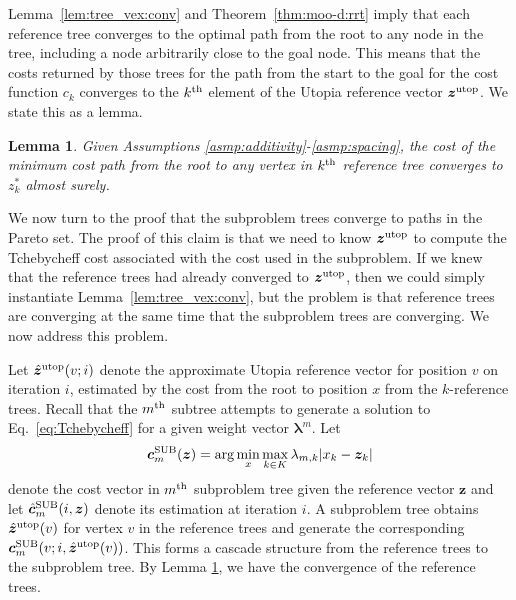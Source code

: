 \documentclass{article}
\newtheorem{lem}{Lemma}
\begin{document}
Lemma~\ref{lem:tree_vex:conv} and Theorem~\ref{thm:moo-d:rrt} imply that each reference tree converges to the optimal path from the root to any node in the tree, including a node arbitrarily close to the goal node.  
This means that the costs returned by those trees for the path from the start to the goal for the cost function $c_k$ converges to the $k^{\rm th}$ element of the Utopia reference vector $ \bm{z}^{\rm utop} $.  
We state this as a lemma.
\begin{lem}
\label{lem:ref_tree:conv}
Given Assumptions \ref{asmp:additivity}-\ref{asmp:spacing},
the cost of the minimum cost path from the root to any vertex in $ k^{\rm th} $ reference tree converges to $ z^{*}_{k} $ almost surely. %
\end{lem}

We now turn to the proof that the subproblem trees converge to paths in the Pareto set.
The proof of this claim is that we need to know $\bm{z}^{\rm utop} $ to compute the Tchebycheff cost associated with the cost used in the subproblem. 
If we knew that the reference trees had already converged to $\bm{z}^{\rm utop} $, then we could simply instantiate Lemma~\ref{lem:tree_vex:conv}, but the problem is that reference trees are converging at the same time that the subproblem trees are converging.
We now address this problem.  

Let $ \hat{\bm{z}}^{\rm utop}(v;i) $ denote the approximate Utopia reference vector for position $v$ on iteration $i$, estimated by the cost from the root to position $x$ from the $k$-reference trees.
Recall that the $m^{\rm th}$ subtree attempts to generate a solution to Eq.~\eqref{eq:Tchebycheff} for a given weight vector ${\mathbf \lambda}^m$.
Let
\begin{equation}
\label{eq:c_def}
 \bm{c}^{\rm SUB}_{m} ( \bm{z} ) 
 = \arg \min_{x} \max_{ k \in K } \lambda_{m, k} | x_{k} - \bm{z}_{k} | 
\end{equation} denote the cost vector in $ m^{\rm th} $ subproblem tree given the reference vector $ \bm{z} $ and let
$ \hat{ \bm{c} }^{\rm SUB}_{m} ( i, \bm{z} ) $ denote its estimation at iteration $ i $.
A subproblem tree obtains $ \hat{\bm{z}}^{\rm utop} (v) $ for vertex $ v $ in the reference trees and generate the corresponding $ \bm{c}^{\rm SUB}_{m} ( v ; i, \hat{\bm{z}}^{\rm utop} (v) ) $.
This forms a cascade structure from the reference trees to the subproblem tree. 
By Lemma \ref{lem:ref_tree:conv}, we have the convergence of the reference trees.
\end{document}
